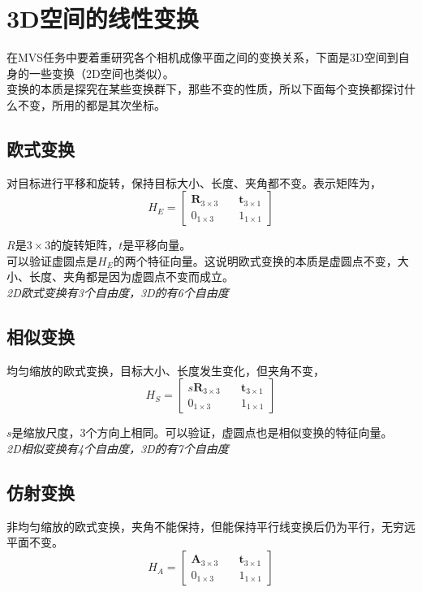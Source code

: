 \section{3D空间的线性变换}

	在MVS任务中要着重研究各个相机成像平面之间的变换关系，下面是3D空间到自身的一些变换（2D空间也类似）。\\

	变换的本质是探究在某些变换群下，那些不变的性质，所以下面每个变换都探讨什么不变，所用的都是其次坐标。

	\subsection{欧式变换}
		对目标进行平移和旋转，保持目标大小、长度、夹角都不变。表示矩阵为，
		$$
			H_E = \begin{bmatrix}
				\mathbf{R}_{3\times 3}\quad& \mathbf{t}_{3\times 1}\\
				0_{1\times 3} \quad& 1_{1\times 1}
			\end{bmatrix}
		$$

		$R$是$3\times 3$的旋转矩阵，$t$是平移向量。\\

		可以验证虚圆点是$H_E$的两个特征向量。这说明欧式变换的本质是虚圆点不变，大小、长度、夹角都是因为虚圆点不变而成立。\\

		\textit{2D欧式变换有3个自由度，3D的有6个自由度}

	\subsection{相似变换}
		均匀缩放的欧式变换，目标大小、长度发生变化，但夹角不变，
		$$
			H_S = \begin{bmatrix}
				s\mathbf{R}_{3\times 3}\quad& \mathbf{t}_{3\times 1}\\
				0_{1\times 3} \quad& 1_{1\times 1}
			\end{bmatrix}
		$$

		$s$是缩放尺度，3个方向上相同。可以验证，虚圆点也是相似变换的特征向量。\\

		\textit{2D相似变换有4个自由度，3D的有7个自由度}
	
	\subsection{仿射变换}
		非均匀缩放的欧式变换，夹角不能保持，但能保持平行线变换后仍为平行，无穷远平面不变。
		$$
			H_A = \begin{bmatrix}
				\mathbf{A}_{3\times 3}\quad& \mathbf{t}_{3\times 1}\\
				0_{1\times 3} \quad& 1_{1\times 1}
			\end{bmatrix}
		$$

